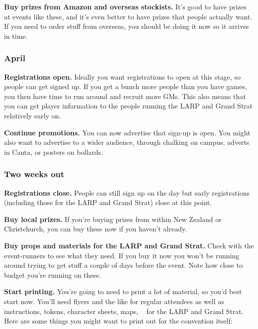 \textbf{Buy prizes from Amazon and overseas stockists.} It's good to have prizes at events like these, and it's even better to have prizes that people actually want. If you need to order stuff from overseas, you should be doing it now so it arrives in time.

\subsubsection{April}

\textbf{Registrations open.} Ideally you want registrations to open at this stage, so people can get signed up. If you get a bunch more people than you have games, you then have time to run around and recruit more GMs. This also means that you can get player information to the people running the LARP and Grand Strat relatively early on.

\textbf{Continue promotions.} You can now advertise that sign-up is open. You might also want to advertise to a wider audience, \eg through chalking on campus, adverts in Canta, or posters on bollards.

\subsubsection{Two weeks out}

\textbf{Registrations close.} People can still sign up on the day but early registrations (including those for the LARP and Grand Strat) close at this point.

\textbf{Buy local prizes.} If you're buying prizes from within New Zealand or Christchurch, you can buy these now if you haven't already.

\textbf{Buy props and materials for the LARP and Grand Strat.} Check with the event-runners to see what they need. If you buy it now you won't be running around trying to get stuff a couple of days before the event. Note how close to budget you're running on these.

\textbf{Start printing.} You're going to need to print a lot of material, so you'd best start now. You'll need flyers and the like for regular attendees as well as instructions, tokens, character sheets, maps, \etc~ for the LARP and Grand Strat. Here are some things you might want to print out for the convention itself:

